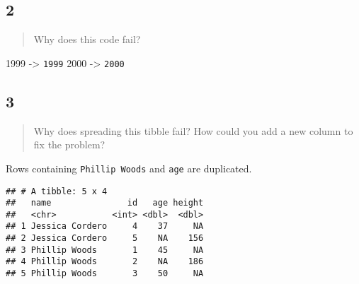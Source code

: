 \documentclass[]{ltjsarticle}
\newenvironment{Shaded}{\begin{snugshade}}{\end{snugshade}}
\newcommand{\CommentTok}[1]{\textcolor[rgb]{0.56,0.35,0.01}{\textit{#1}}}
\newcommand{\DataTypeTok}[1]{\textcolor[rgb]{0.13,0.29,0.53}{#1}}
\newcommand{\DecValTok}[1]{\textcolor[rgb]{0.00,0.00,0.81}{#1}}
\newcommand{\KeywordTok}[1]{\textcolor[rgb]{0.13,0.29,0.53}{\textbf{#1}}}
\newcommand{\NormalTok}[1]{#1}
\newcommand{\OperatorTok}[1]{\textcolor[rgb]{0.81,0.36,0.00}{\textbf{#1}}}
\newcommand{\StringTok}[1]{\textcolor[rgb]{0.31,0.60,0.02}{#1}}
\begin{document}
\hypertarget{section-6}{%
\subsection{2}\label{section-6}}

\begin{quote}
Why does this code fail?
\end{quote}

1999 -\textgreater{} \texttt{1999} 2000 -\textgreater{} \texttt{2000}

\hypertarget{section-7}{%
\subsection{3}\label{section-7}}

\begin{quote}
Why does spreading this tibble fail? How could you add a new column to
fix the problem?
\end{quote}

Rows containing \texttt{Phillip\ Woods} and \texttt{age} are duplicated.

\begin{Shaded}
\end{Shaded}

\begin{verbatim}
## # A tibble: 5 x 4
##   name               id   age height
##   <chr>           <int> <dbl>  <dbl>
## 1 Jessica Cordero     4    37     NA
## 2 Jessica Cordero     5    NA    156
## 3 Phillip Woods       1    45     NA
## 4 Phillip Woods       2    NA    186
## 5 Phillip Woods       3    50     NA
\end{verbatim}
\end{document}
